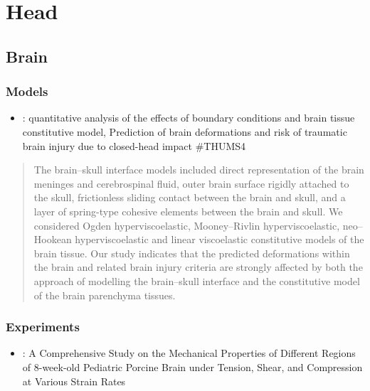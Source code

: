 \documentclass[]{book}
\providecommand{\tightlist}{%
  \setlength{\itemsep}{0pt}\setlength{\parskip}{0pt}}
\begin{document}
\hypertarget{head}{%
\chapter{Head}\label{head}}

\hypertarget{brain}{%
\section{Brain}\label{brain}}

\hypertarget{models}{%
\subsection{Models}\label{models}}

\begin{itemize}
\tightlist
\item
  \citet{Wang2018}: quantitative analysis of the effects of boundary conditions and brain tissue constitutive model, Prediction of brain deformations and risk of traumatic brain injury due to closed-head impact
  \#THUMS4
\end{itemize}

\begin{quote}
The brain--skull interface models included direct representation of the brain meninges and cerebrospinal fluid, outer brain surface rigidly attached to the skull, frictionless sliding contact between the brain and skull, and a layer of spring-type cohesive elements between the brain and skull. We considered Ogden hyperviscoelastic, Mooney--Rivlin hyperviscoelastic, neo--Hookean hyperviscoelastic and linear viscoelastic constitutive models of the brain tissue. Our study indicates that the predicted deformations within the brain and related brain injury criteria are strongly affected by both the approach of modelling the brain--skull interface and the constitutive model of the brain parenchyma tissues.
\end{quote}

\hypertarget{experiments}{%
\subsection{Experiments}\label{experiments}}

\begin{itemize}
\tightlist
\item
  \citet{Li2019}: A Comprehensive Study on the Mechanical Properties of Different Regions of 8-week-old Pediatric Porcine Brain under Tension, Shear, and Compression at Various Strain Rates
\end{itemize}
\end{document}
